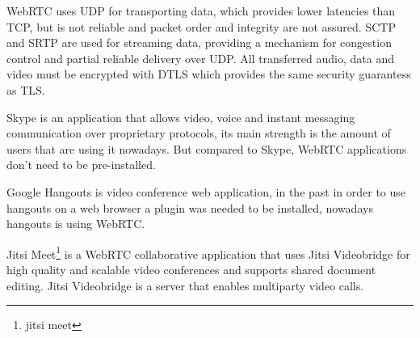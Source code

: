 \ac{WebRTC} uses \ac{UDP} for transporting data, which provides lower latencies than \ac{TCP}, but is not reliable and packet order and integrity are not assured. \ac{SCTP} and \ac{SRTP} are used for streaming data, providing a mechanism for congestion control and partial reliable delivery over \ac{UDP}. All transferred audio, data and video must be encrypted with \ac{DTLS} which provides the same security guarantess as \ac{TLS}. 

Skype is an application that allows video, voice and instant messaging communication over proprietary protocols, its main strength is the amount of users that are using it nowadays. But compared to Skype, \ac{WebRTC} applications don't need to be pre-installed.

Google Hangouts is video conference web application, in the past in order to use hangouts on a web browser a plugin was needed to be installed, nowadays hangouts is using \ac{WebRTC}.

Jitsi Meet\footnote{jitsi meet} is a \ac{WebRTC} collaborative application that uses Jitsi Videobridge for high quality and scalable video conferences and supports shared document editing. Jitsi Videobridge is a server that enables multiparty video calls.




